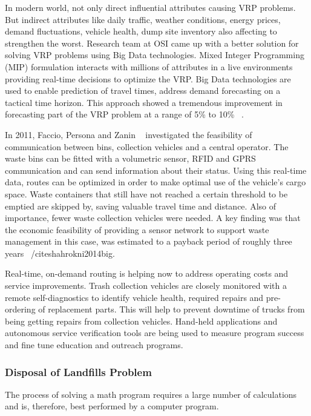 \documentclass[sigconf]{acmart}
\begin{document}
In modern world, not only direct influential attributes causing VRP problems. But indirect attributes like daily traffic, weather conditions, energy prices, demand fluctuations, vehicle health, dump site inventory also affecting to strengthen the worst. Research team at OSI came up with a better solution for solving VRP problems using Big Data technologies. Mixed Integer Programming (MIP) formulation interacts with millions of attributes in a live environments providing real-time decisions to optimize the VRP. Big Data technologies are used to enable prediction of travel times, address demand forecasting on a tactical time horizon. This approach showed a tremendous improvement in forecasting part of the VRP problem at a range of 5\% to 10\% ~\cite{vijay2013}.

In 2011, Faccio, Persona and Zanin ~\cite{faccio2011} investigated the feasibility of communication between bins, collection vehicles and a central operator. The waste bins can be fitted with a volumetric sensor, RFID and GPRS communication and can send information about their status. Using this real-time data, routes can be optimized in order to make optimal use of the vehicle's cargo space. Waste containers that still have not reached a certain threshold to be emptied are skipped by, saving valuable travel time and distance. Also of importance, fewer waste collection vehicles were needed. A key ﬁnding was that the economic feasibility of providing a sensor network to support waste management in this case, was estimated to a payback period of roughly three years ~/cite{shahrokni2014big}.

Real-time, on-demand routing is helping now to address operating costs and service improvements. Trash collection vehicles are closely monitored with a remote self-diagnostics to identify vehicle health, required repairs and pre-ordering of replacement parts. This will help to prevent downtime of trucks from being getting repairs from collection vehicles. Hand-held applications and autonomous service verification tools are being used to measure program success and fine tune education and outreach programs.

\subsubsection{Disposal of Landfills Problem}


The process of solving a math program requires a large number of calculations and is, therefore, best performed by a computer program. ~\cite{akbarpour2016}
\end{document}
